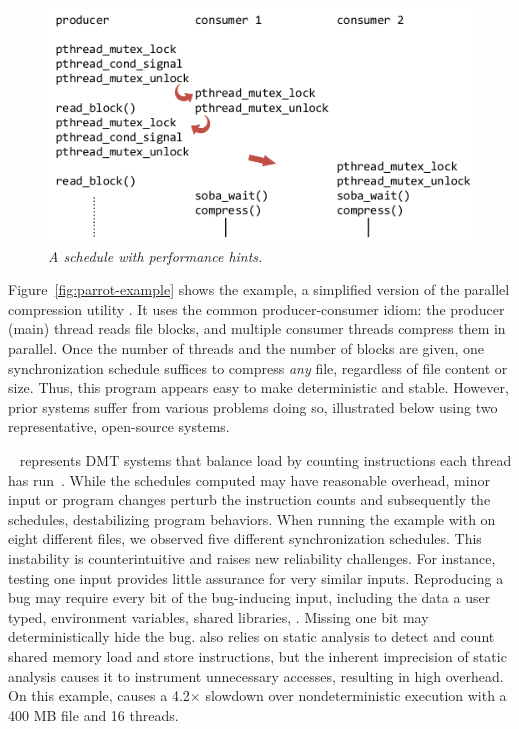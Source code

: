 \begin{figure}[t]
\centering
\includegraphics[width=0.6\columnwidth]{parrot/figures/parrot_schedule}
\vspace{-.2in}
\caption{{\em A \parrot schedule with performance
    hints.}}\label{fig:parrot-schedule}
\vspace{-.05in}
\end{figure}


Figure~\ref{fig:parrot-example} shows the example, a simplified version of the parallel
compression utility \pbzip\cite{pbzip2}.  It uses the common producer-consumer idiom:
the producer (main) thread reads file blocks, and multiple consumer
threads compress them in parallel.  Once the number of threads and the
number of blocks are given, one synchronization schedule suffices to
compress \emph{any} file, regardless of file content or size.  Thus, this program appears
easy to make deterministic and stable.  However, prior systems suffer from
various problems doing so, illustrated below using
two representative, open-source systems.


\coredet~\cite{coredet:asplos10} represents DMT systems that balance load
by counting instructions each thread has run~\cite{coredet:asplos10,
 kendo:asplos09, dmp:asplos09, dos:osdi10, ddos:asplos13}.  While the
schedules computed may have reasonable overhead, minor input or program
changes perturb the instruction counts and subsequently the schedules,
destabilizing program behaviors.  When running the example
with \coredet on eight different files, we observed
five different synchronization schedules.  This instability is
counterintuitive and raises new reliability challenges.  For instance,
testing one input provides little assurance for very similar inputs.
Reproducing a bug may require every bit of the bug-inducing input,
including the data a user typed, environment variables, shared libraries,
\etc. Missing one bit may deterministically hide the bug.  \coredet also
relies on static analysis to detect and count shared memory load and store
instructions, but the inherent imprecision of static analysis causes it to
instrument unnecessary accesses, resulting in high overhead.  On this
example, \coredet causes a 4.2$\times$ slowdown over nondeterministic execution with a 400
MB file and 16 threads.


